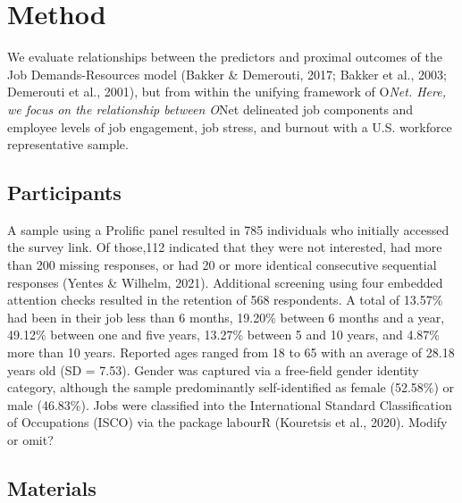 \documentclass[
  man]{apa6}
\begin{document}
\hypertarget{method}{%
\section{Method}\label{method}}

We evaluate relationships between the predictors and proximal outcomes of the Job Demands-Resources model (Bakker \& Demerouti, 2017; Bakker et al., 2003; Demerouti et al., 2001), but from within the unifying framework of O\emph{Net. Here, we focus on the relationship between O}Net delineated job components and employee levels of job engagement, job stress, and burnout with a U.S. workforce representative sample.

\hypertarget{participants}{%
\subsection{Participants}\label{participants}}

A sample using a Prolific panel resulted in 785 individuals who initially accessed the survey link. Of those,112 indicated that they were not interested, had more than 200 missing responses, or had 20 or more identical consecutive sequential responses (Yentes \& Wilhelm, 2021). Additional screening using four embedded attention checks resulted in the retention of 568 respondents. A total of 13.57\% had been in their job less than 6 months, 19.20\% between 6 months and a year, 49.12\% between one and five years, 13.27\% between 5 and 10 years, and 4.87\% more than 10 years. Reported ages ranged from 18 to 65 with an average of 28.18 years old (SD = 7.53). Gender was captured via a free-field gender identity category, although the sample predominantly self-identified as female (52.58\%) or male (46.83\%). Jobs were classified into the International Standard Classification of Occupations (ISCO) via the package labourR (Kouretsis et al., 2020). Modify or omit?

\hypertarget{materials}{%
\subsection{Materials}\label{materials}}
\end{document}
